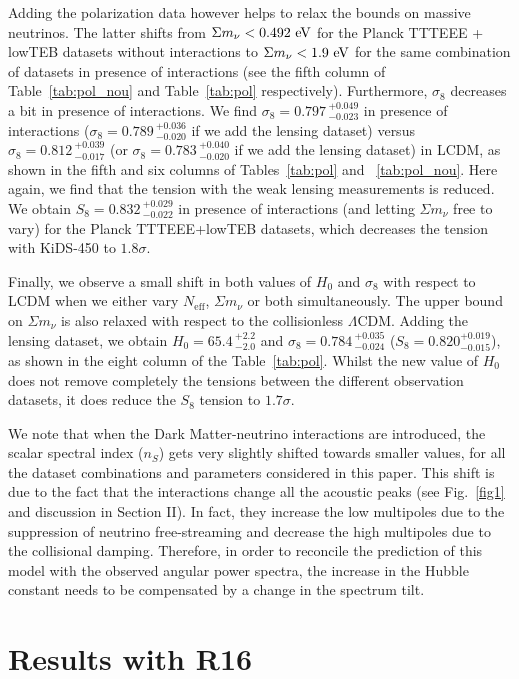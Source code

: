 \documentclass[aps,prd,a4paper,twocolumn,amsmath,showpacs,superscriptaddress,nofootinbib,preprintnumbers]{revtex4-1}
\newcommand{\neff}{N_{\mathrm{eff}}}
\newcommand{\mnu}{{\Sigma}m_{\nu}}
\begin{document}
Adding the polarization data however helps to relax the bounds on massive neutrinos. The latter shifts from $\mnu<0.492 \ \rm{eV}$ for the Planck TTTEEE + lowTEB datasets without interactions  to $\mnu<1.9 \ \rm{eV}$ for the same combination of datasets in presence of interactions (see the fifth column of  Table~\ref{tab:pol_nou} and Table~\ref{tab:pol} respectively). Furthermore, $\sigma_8$ decreases a bit in presence of interactions. We find $\sigma_8= 0.797\,_{-0.023}^{+0.049}$ in presence of interactions ($\sigma_8= 0.789\,_{-0.020}^{+0.036}$ if we add the lensing dataset) versus $\sigma_8= 0.812\,^{+0.039}_{-0.017}$ (or $\sigma_8= 0.783\,_{-0.020}^{+0.040}$ if we add the lensing dataset) in LCDM, as shown in the fifth and six columns of Tables~\ref{tab:pol} and ~\ref{tab:pol_nou}.
Here again, we find that the tension with the weak lensing measurements is reduced. We obtain $S_8=0.832\, _{-0.022}^{+0.029}$ in presence of interactions (and letting $\mnu$ free to vary) for the Planck TTTEEE+lowTEB datasets, which decreases the tension with KiDS-450 to $1.8\sigma$.

Finally, we observe a small shift in both values of $H_0$ and $\sigma_8$ with respect to LCDM when we either vary $\neff$, $\mnu$ or both simultaneously. The upper bound on $\mnu$ is also relaxed with respect to the collisionless $\Lambda$CDM. Adding the lensing dataset, we obtain  $H_0=65.4\, ^{+2.2}_{-2.0}$ and $\sigma_8= 0.784\,_{-0.024}^{+0.035}$ ($S_8=0.820_{-0.015}^{+0.019}$), as shown in the eight column of the Table~\ref{tab:pol}. Whilst the new value of $H_0$ does not remove completely the tensions between the different  observation datasets, it does reduce the $S_8$ tension to $1.7\sigma$. 

We note that when the Dark Matter-neutrino interactions are introduced, the scalar spectral index ($n_S$) gets very slightly shifted towards smaller values, for all the dataset combinations and parameters considered in this paper. This shift is due to the fact that the interactions change all the acoustic peaks (see Fig.~\ref{fig1} and discussion in Section II). In fact, they increase the low multipoles due to the suppression of neutrino free-streaming and decrease the high multipoles due to the collisional damping. Therefore, in order to reconcile the prediction of this model with the observed angular power spectra, the increase in the Hubble constant needs to be compensated by a change in the spectrum tilt.

\section{Results with R16}\label{sec:r16}
\end{document}
